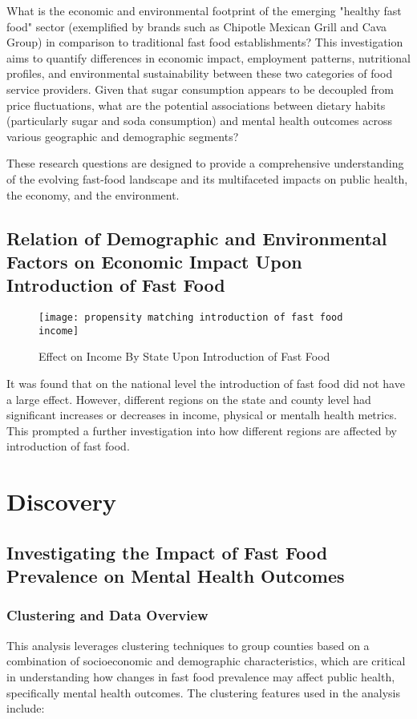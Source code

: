 \documentclass[letterpaper, 11pt]{report}
\begin{document}
What is the economic and environmental footprint of the emerging "healthy fast food" sector (exemplified by brands such as Chipotle Mexican Grill and Cava Group) in comparison to traditional fast food establishments? This investigation aims to quantify differences in economic impact, employment patterns, nutritional profiles, and environmental sustainability between these two categories of food service providers.
Given that sugar consumption appears to be decoupled from price fluctuations, what are the potential associations between dietary habits (particularly sugar and soda consumption) and mental health outcomes across various geographic and demographic segments?

These research questions are designed to provide a comprehensive understanding of the evolving fast-food landscape and its multifaceted impacts on public health, the economy, and the environment.


\subsection*{Relation of Demographic and Environmental Factors on Economic Impact Upon Introduction of Fast Food}

\begin{figure}[h!]
    \centering
    \texttt{[image: propensity matching introduction of fast food income]}
    \caption{Effect on Income By State Upon Introduction of Fast Food}
    \label{fig:employees}
\end{figure}

It was found that on the national level the introduction of fast food did not have a large effect. However, different regions on the state and county level had significant increases or decreases in income, physical or mentalh health metrics. This prompted a further investigation into how different regions are affected by introduction of fast food.
\newpage
\section{Discovery}

\subsection{Investigating the Impact of Fast Food Prevalence on Mental Health Outcomes}

\subsubsection{Clustering and Data Overview}
This analysis leverages clustering techniques to group counties based on a combination of socioeconomic and demographic characteristics, which are critical in understanding how changes in fast food prevalence may affect public health, specifically mental health outcomes. The clustering features used in the analysis include:
\end{document}
